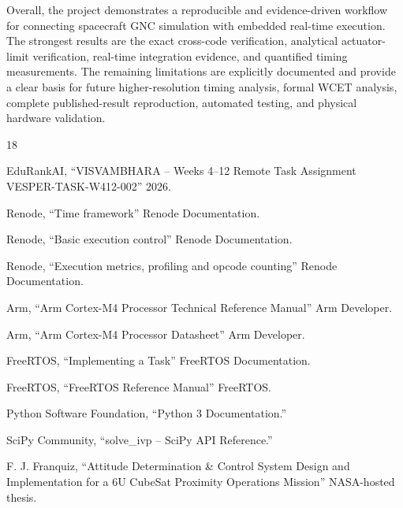 \documentclass[11pt,a4paper]{article}
\begin{document}
Overall, the project demonstrates a reproducible and evidence-driven workflow for connecting spacecraft GNC simulation with embedded real-time execution. The strongest results are the exact cross-code verification, analytical actuator-limit verification, real-time integration evidence, and quantified timing measurements. The remaining limitations are explicitly documented and provide a clear basis for future higher-resolution timing analysis, formal WCET analysis, complete published-result reproduction, automated testing, and physical hardware validation.


\begin{thebibliography}{18}

 EduRankAI, ``VISVAMBHARA -- Weeks 4--12 Remote Task Assignment VESPER-TASK-W412-002'' 2026.

 Renode, ``Time framework'' Renode Documentation.

 Renode, ``Basic execution control'' Renode Documentation.



 Renode, ``Execution metrics, profiling and opcode counting'' Renode Documentation.


 Arm, ``Arm Cortex-M4 Processor Technical Reference Manual'' Arm Developer.

 Arm, ``Arm Cortex-M4 Processor Datasheet'' Arm Developer.



 FreeRTOS, ``Implementing a Task'' FreeRTOS Documentation.

 FreeRTOS, ``FreeRTOS Reference Manual'' FreeRTOS.

 Python Software Foundation, ``Python 3 Documentation.''

 SciPy Community, ``solve_ivp -- SciPy API Reference.''


 F. J. Franquiz, ``Attitude Determination \& Control System Design and Implementation for a 6U CubeSat Proximity Operations Mission'' NASA-hosted thesis.


\end{thebibliography}
\end{document}
